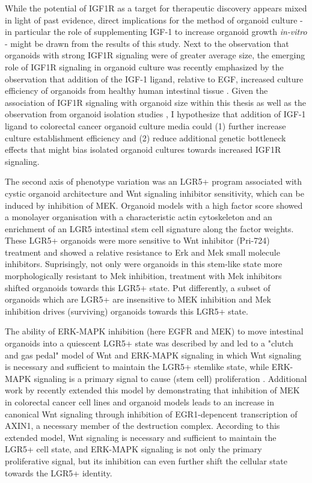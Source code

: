 \begin{flushleft}
While the potential of IGF1R as a target for therapeutic discovery appears mixed in light of past evidence, direct implications for the method of organoid culture - in particular the role of supplementing IGF-1 to increase organoid growth \textit{in-vitro} - might be drawn from the results of this study. Next to the observation that organoids with strong IGF1R signaling were of greater average size, the emerging role of IGF1R signaling in organoid culture was recently emphasized by the observation that addition of the IGF-1 ligand, relative to EGF, increased culture efficiency of organoids from healthy human intestinal tissue \citep{fujiiHumanIntestinalOrganoids2018a}. Given the association of IGF1R signaling with organoid size within this thesis as well as the observation from organoid isolation studies \citep{fujiiHumanIntestinalOrganoids2018a}, I hypothesize that addition of IGF-1 ligand to colorectal cancer organoid culture media could (1) further increase culture establishment efficiency and (2) reduce additional genetic bottleneck effects that might bias isolated organoid cultures towards increased IGF1R signaling.
\smallbreak

The second axis of phenotype variation was an LGR5+ program associated with cystic organoid architecture and Wnt signaling inhibitor sensitivity, which can be induced by inhibition of MEK. Organoid models with a high factor score showed a monolayer organisation with a characteristic actin cytoskeleton and an enrichment of an LGR5 intestinal stem cell signature along the factor weights. These LGR5+ organoids were more sensitive to Wnt inhibitor (Pri-724) treatment and showed a relative resistance to Erk and Mek small molecule inhibitors. Suprisingly, not only were organoids in this stem-like state more morphologically resistant to Mek inhibition, treatment with Mek inhibitors shifted organoids towards this LGR5+ state. Put differently, a subset of organoids which are LGR5+ are insensitive to MEK inhibition and Mek inhibition drives (surviving) organoids towards this LGR5+ state.
\par

The ability of ERK-MAPK inhibition (here EGFR and MEK) to move intestinal organoids into a quiescent LGR5+ state was described by \citep{basakInducedQuiescenceLgr52017c} and led to a "clutch and gas pedal" model of Wnt and ERK-MAPK signaling in which Wnt signaling is necessary and sufficient to maintain the LGR5+ stemlike state, while ERK-MAPK signaling is a primary signal to cause (stem cell) proliferation \citep{basakInducedQuiescenceLgr52017c}. Additional work by \citep{zhanMEKInhibitorsActivate2019a} recently extended this model by demonstrating that inhibition of MEK in colorectal cancer cell lines and organoid models leads to an increase in canonical Wnt signaling through inhibition of EGR1-depencent transcription of AXIN1, a necessary member of the destruction complex. According to this extended model, Wnt signaling is necessary and sufficient to maintain the LGR5+ cell state, and ERK-MAPK signaling is not only the primary proliferative signal, but its inhibition can even further shift the cellular state towards the LGR5+ identity. 



\end{flushleft}
